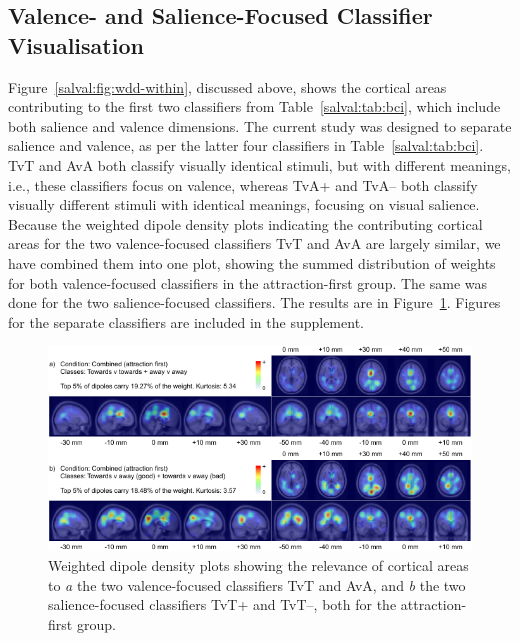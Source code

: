 \subsection{Valence- and Salience-Focused Classifier Visualisation}
\label{salval:sec:results:classvis}

Figure~\ref{salval:fig:wdd-within}, discussed above, shows the cortical areas contributing to the first two classifiers from Table~\ref{salval:tab:bci}, which include both salience and valence dimensions. The current study was designed to separate salience and valence, as per the latter four classifiers in Table~\ref{salval:tab:bci}. TvT and AvA both classify visually identical stimuli, but with different meanings, i.e., these classifiers focus on valence, whereas TvA+ and TvA-- both classify visually different stimuli with identical meanings, focusing on visual salience. Because the weighted dipole density plots indicating the contributing cortical areas for the two valence-focused classifiers TvT and AvA are largely similar, we have combined them into one plot, showing the summed distribution of weights for both valence-focused classifiers in the attraction-first group. The same was done for the two salience-focused classifiers. The results are in Figure~\ref{salval:fig:posfirst-wdd-combined-sum}. Figures for the separate classifiers are included in the supplement. 

\begin{figure}[hbtp]
    \centering
    \includegraphics[width=\textwidth]{figures/salval-posfirst-wdd-combined-sum.pdf}
    \caption[Weighted dipole density plots of the combined salience- and valence-focused classifiers, for the attraction-first group.]{Weighted dipole density plots showing the relevance of cortical areas to \emph{a} the two valence-focused classifiers TvT and AvA, and \emph{b} the two salience-focused classifiers TvT+ and TvT--, both for the attraction-first group.}
    \label{salval:fig:posfirst-wdd-combined-sum}
\end{figure}

